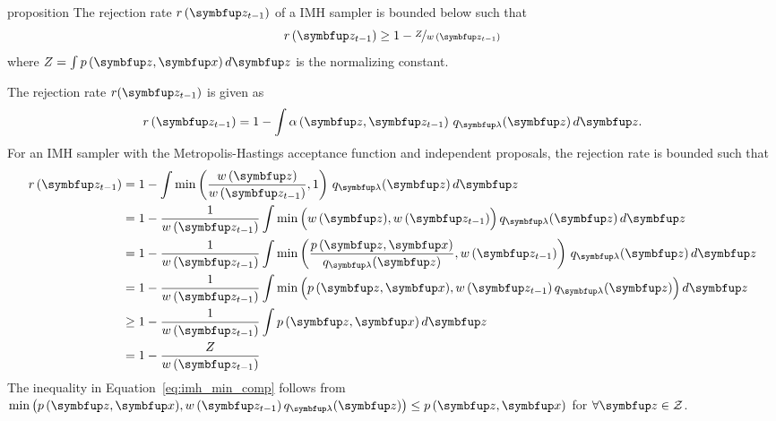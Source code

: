 
\begin{theoremEnd}[]{proposition}\label{thm:imh_bound}
  The rejection rate \(r\,(\vz_{t-1})\) of a IMH sampler is bounded below such that
  \[
  r\,(\vz_{t-1}) \geq 1 - \nicefrac{Z}{w\,(\vz_{t-1})} 
  \]
  where \(Z=\int p\,(\vz,\vx) \, d\vz\) is the normalizing constant.
\end{theoremEnd}
\begin{proofEnd}
  The rejection rate \(r(\vz_{t-1})\) is given as
  \begin{align}
    r\,(\vz_{t-1}) = 1 - \int \alpha\left(\vz, \vz_{t-1} \right) \, q_{\vlambda}(\vz) \, d\vz.
  \end{align}
  For an IMH sampler with the Metropolis-Hastings acceptance function and independent proposals, the rejection rate is bounded such that
  \begin{align}
    r\,(\vz_{t-1})
    &= 1 - \int \min\left(\frac{w\,(\vz)}{w\,(\vz_{t-1})}, 1 \right) \, q_{\vlambda}(\vz)\,d\vz \\
    &= 1 - \frac{1}{w\,(\vz_{t-1})} \int \min\Big(w\,(\vz), w\,(\vz_{t-1})\Big) \, q_{\vlambda}(\vz)\,d\vz \\
    &= 1 - \frac{1}{w\,(\vz_{t-1})} \int \min\left(\frac{p\,(\vz,\vx)}{q_{\vlambda}(\vz)}, w\,(\vz_{t-1})\right) \, q_{\vlambda}(\vz)\,d\vz \\
    &=    1 - \frac{1}{w\,(\vz_{t-1})} \int \min\Big(p\,(\vz,\vx), w\,(\vz_{t-1})\,q_{\vlambda}(\vz)\Big) \, d\vz  \\
    &\geq 1 - \frac{1}{w\,(\vz_{t-1})} \int p\,(\vz,\vx) \, d\vz \label{eq:imh_min_comp} \\
    &=    1 - \frac{Z}{w\,(\vz_{t-1})} 
  \end{align}
  The inequality in Equation~\eqref{eq:imh_min_comp} follows from \(\min\big(p\,(\vz,\vx), w\,(\vz_{t-1})\,q_{\vlambda}(\vz)\big) \leq p\,(\vz,\vx) \) for \(\forall \vz \in \mathcal{Z}\).
\end{proofEnd}

